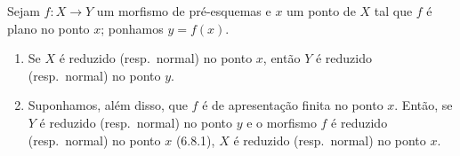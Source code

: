 \begin{proposition}[11.3.13]
\label{IV.11.3.13}
Sejam $f:X\to Y$ um morfismo de
pré-esquemas e $x$ um ponto de $X$
tal que $f$ é plano no ponto $x$;
ponhamos $y=f(x)$.
\begin{enumerate}[label=\emph{(\roman*)}]
\item Se $X$ é reduzido (resp.\ normal)
no ponto $x$, então $Y$ é reduzido
(resp.\ normal) no ponto $y$.
\item Suponhamos, além disso, que $f$
é de apresentação finita no ponto $x$.
Então, se $Y$ é reduzido (resp.\ normal)
no ponto $y$ e o morfismo $f$ é
reduzido (resp.\ normal) no ponto $x$
(6.8.1), $X$ é reduzido (resp.\ normal)
no ponto $x$.
\end{enumerate}
\end{proposition}

